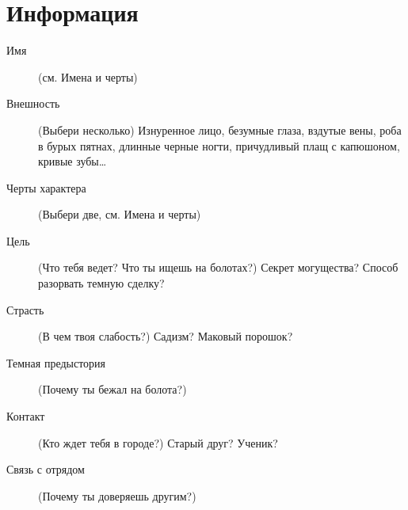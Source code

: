 \section*{Информация}
\begin{description}
\item[Имя]{\footnotesize (см. Имена и черты)}
\item[Внешность] {\footnotesize (Выбери несколько) Изнуренное лицо,
    безумные глаза,  вздутые вены, роба в бурых пятнах, длинные черные
    ногти, причудливый   плащ с капюшоном, кривые зубы\ldots}

\item[Черты характера]{\footnotesize (Выбери две, см. Имена и черты)}

\item[Цель] {\footnotesize (Что тебя ведет? Что ты ищешь на болотах?)
    Секрет   могущества? Способ разорвать темную сделку?}

\item[Страсть]{\footnotesize (В чем твоя слабость?) Садизм? Маковый порошок?}

\item[Темная предыстория]{\footnotesize (Почему ты бежал на болота?)}

\item[Контакт] {\footnotesize (Кто ждет тебя в городе?) Старый друг? Ученик?}

\item[Связь с отрядом]{\footnotesize (Почему ты доверяешь другим?)}
\end{description}
\pagebreak